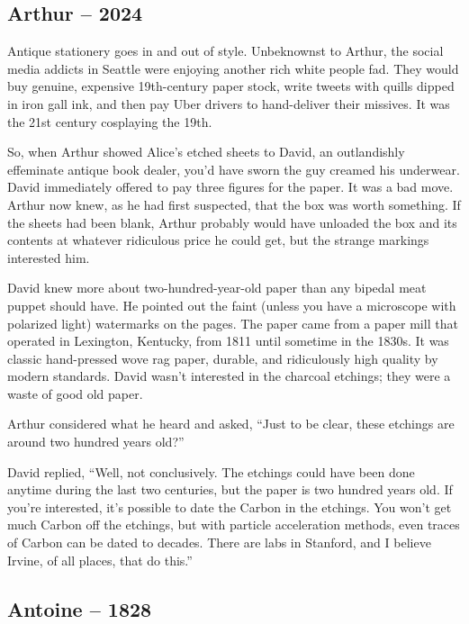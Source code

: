 \hypertarget{arthur-2024-3}{%
\subsection*{Arthur -- 2024}\label{arthur-2024-3}}

Antique stationery goes in and out of style. Unbeknownst to Arthur, the
social media addicts in Seattle were enjoying another rich white people
fad. They would buy genuine, expensive 19th-century paper stock, write
tweets with quills dipped in iron gall ink, and then pay Uber drivers to
hand-deliver their missives. It was the 21st century cosplaying the
19th.

So, when Arthur showed Alice's etched sheets to David, an outlandishly
effeminate antique book dealer, you'd have sworn the guy creamed his
underwear. David immediately offered to pay three figures for the paper.
It was a bad move. Arthur now knew, as he had first suspected, that the
box was worth something. If the sheets had been blank, Arthur probably
would have unloaded the box and its contents at whatever ridiculous
price he could get, but the strange markings interested him.

David knew more about two-hundred-year-old paper than any bipedal meat
puppet should have. He pointed out the faint (unless you have a
microscope with polarized light) watermarks on the pages. The paper came
from a paper mill that operated in Lexington, Kentucky, from 1811 until
sometime in the 1830s. It was classic hand-pressed wove rag paper,
durable, and ridiculously high quality by modern standards. David wasn't
interested in the charcoal etchings; they were a waste of good old
paper.

Arthur considered what he heard and asked, ``Just to be clear, these
etchings are around two hundred years old?''

David replied, ``Well, not conclusively. The etchings could have been
done anytime during the last two centuries, but the paper is two hundred
years old. If you're interested, it's possible to date the Carbon in the
etchings. You won't get much Carbon off the etchings, but with particle
acceleration methods, even traces of Carbon can be dated to decades.
There are labs in Stanford, and I believe Irvine, of all places, that do
this.''

\hypertarget{antoine-1828}{%
\subsection*{Antoine -- 1828}\label{antoine-1828}}

